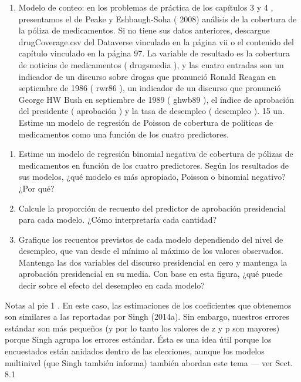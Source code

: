 \documentclass[
]{book}
\providecommand{\tightlist}{%
  \setlength{\itemsep}{0pt}\setlength{\parskip}{0pt}}
\begin{document}
\begin{enumerate}
\def\labelenumi{\arabic{enumi}.}
\setcounter{enumi}{2}
\tightlist
\item
  Modelo de conteo: en los problemas de práctica de los capítulos 3 y 4 , presentamos el de Peake y Eshbaugh-Soha ( 2008) análisis de la cobertura de la póliza de medicamentos. Si no tiene sus datos anteriores, descargue drugCoverage.csv del Dataverse vinculado en la página vii o el contenido del capítulo vinculado en la página 97. La variable de resultado es la cobertura de noticias de medicamentos ( drugsmedia ), y las cuatro entradas son un indicador de un discurso sobre drogas que pronunció Ronald Reagan en septiembre de 1986 ( rwr86 ), un indicador de un discurso que pronunció George HW Bush en septiembre de 1989 ( ghwb89 ), el índice de aprobación del presidente ( aprobación ) y la tasa de desempleo ( desempleo ). 15
  un.
  Estime un modelo de regresión de Poisson de cobertura de políticas de medicamentos como una función de los cuatro predictores.
\end{enumerate}

\begin{enumerate}
\def\labelenumi{\Alph{enumi}.}
\setcounter{enumi}{1}
\item
  Estime un modelo de regresión binomial negativa de cobertura de pólizas de medicamentos en función de los cuatro predictores. Según los resultados de sus modelos, ¿qué modelo es más apropiado, Poisson o binomial negativo? ¿Por qué?
\item
  Calcule la proporción de recuento del predictor de aprobación presidencial para cada modelo. ¿Cómo interpretaría cada cantidad?
\item
  Grafique los recuentos previstos de cada modelo dependiendo del nivel de desempleo, que van desde el mínimo al máximo de los valores observados. Mantenga las dos variables del discurso presidencial en cero y mantenga la aprobación presidencial en su media. Con base en esta figura, ¿qué puede decir sobre el efecto del desempleo en cada modelo?
\end{enumerate}

Notas al pie
1 .
En este caso, las estimaciones de los coeficientes que obtenemos son similares a las reportadas por Singh (2014a). Sin embargo, nuestros errores estándar son más pequeños (y por lo tanto los valores de z y p son mayores) porque Singh agrupa los errores estándar. Ésta es una idea útil porque los encuestados están anidados dentro de las elecciones, aunque los modelos multinivel (que Singh también informa) también abordan este tema --- ver Sect. 8.1
\end{document}
